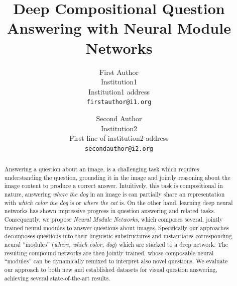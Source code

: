 \documentclass[10pt,twocolumn,letterpaper]{article}
\begin{document}
\newcommand{\mod}[1]{{\small\texttt{#1}}}

\title{Deep Compositional Question Answering with Neural Module Networks}

\author{First Author\\
Institution1\\
Institution1 address\\
{\tt\small firstauthor@i1.org}
\and
Second Author\\
Institution2\\
First line of institution2 address\\
{\tt\small secondauthor@i2.org}
}

\maketitle

\begin{abstract}
Answering a question about an image, is a challenging task which requires understanding the question, grounding it in the image and jointly reasoning about the image content to produce a correct answer. Intuitively, this task is compositional in nature, \ie answering \emph{where the dog} in an image is can partially share an representation with \emph{which color the dog} is or \emph{where the cat} is. On the other hand, learning deep neural networks has shown impressive progress in question answering and related tasks. Consequently, we propose \emph{Neural Module Networks}, which composes several, jointly trained neural modules to answer questions about images. Specifically our approaches decomposes questions into their linguistic substructures and instantiates corresponding neural ``modules'' (\eg \emph{where, which color, dog}) which are stacked to a deep network. The resulting compound
  networks are then jointly trained, whose composable neural ``modules'' 
  can be dynamically remixed to interpret also novel questions. We evaluate our approach
  to both new and established datasets for visual question answering, achieving
  several state-of-the-art results.
\end{abstract}
\end{document}
